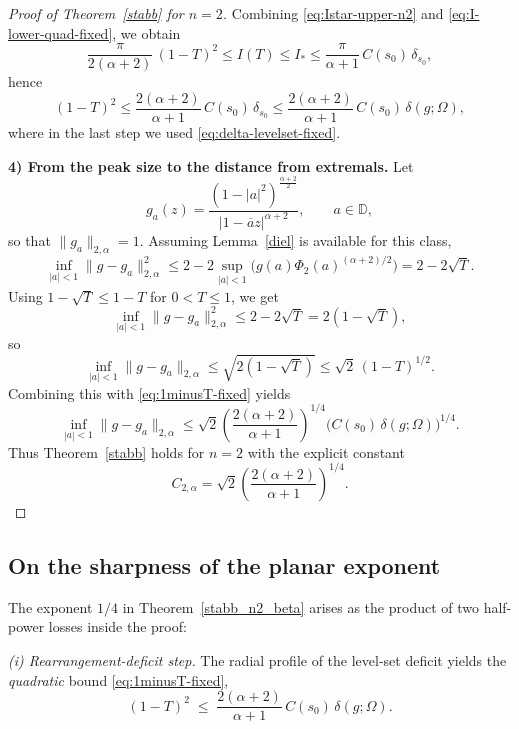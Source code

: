 \documentclass[a4paper,10pt]{amsart}
\newcommand{\D}{\mathbb{D}}
\begin{document}
\begin{proof}[Proof of Theorem~\ref{stabb} for $n=2$]
Combining \eqref{eq:Istar-upper-n2} and \eqref{eq:I-lower-quad-fixed}, we obtain
\[
\frac{\pi}{2(\alpha+2)}\,(1-T)^2
\le I(T)\le I_*
\le \frac{\pi}{\alpha+1}\,C(s_0)\,\delta_{s_0},
\]
hence
\begin{equation}\label{eq:1minusT-fixed}
(1-T)^2
\le
\frac{2(\alpha+2)}{\alpha+1}\,C(s_0)\,\delta_{s_0}
\le
\frac{2(\alpha+2)}{\alpha+1}\,C(s_0)\,\delta(g;\Omega),
\end{equation}
where in the last step we used \eqref{eq:delta-levelset-fixed}.

\smallskip\noindent
\textbf{4) From the peak size to the distance from extremals.}
Let
\[
g_a(z)=
\frac{(1-|a|^2)^{\frac{\alpha+2}{2}}}{|1-\overline{a}z|^{\alpha+2}},
\qquad a\in\D,
\]
so that $\|g_a\|_{2,\alpha}=1$. Assuming Lemma~\ref{diel} is available for this class,
\begin{equation}\label{eq:diel-n2-fixed}
\inf_{|a|<1}\|g-g_a\|_{2,\alpha}^2
\le
2-2\sup_{|a|<1}\bigl(g(a)\Phi_2(a)^{(\alpha+2)/2}\bigr)
=
2-2\sqrt{T}.
\end{equation}
Using $1-\sqrt{T}\le 1-T$ for $0<T\le1$, we get
\[
\inf_{|a|<1}\|g-g_a\|_{2,\alpha}^2
\le
2-2\sqrt{T}
=
2(1-\sqrt{T}),
\]
so
\[
\inf_{|a|<1}\|g-g_a\|_{2,\alpha}
\le
\sqrt{2(1-\sqrt{T})}
\le
\sqrt{2}\,(1-T)^{1/2}.
\]
Combining this with \eqref{eq:1minusT-fixed} yields
\[
\inf_{|a|<1}\|g-g_a\|_{2,\alpha}
\le
\sqrt{2}\left(\frac{2(\alpha+2)}{\alpha+1}\right)^{1/4}
\bigl(C(s_0)\,\delta(g;\Omega)\bigr)^{1/4}.
\]
Thus Theorem~\ref{stabb} holds for $n=2$ with the explicit constant
\[
C_{2,\alpha}
=
\sqrt{2}\left(\frac{2(\alpha+2)}{\alpha+1}\right)^{1/4}.
\]
\end{proof}

\subsection{On the sharpness of the planar exponent}\label{ssec:sharpness-n2}

The exponent $1/4$ in Theorem~\ref{stabb_n2_beta} arises as the product of two
half-power losses inside the proof:

\smallskip\noindent\emph{(i) Rearrangement-deficit step.} The radial profile of
the level-set deficit yields the \emph{quadratic} bound
\eqref{eq:1minusT-fixed},
\begin{equation}\label{eq:sharpness-step-i}
(1-T)^2\;\le\;\frac{2(\alpha+2)}{\alpha+1}\,C(s_0)\,\delta(g;\Omega).
\end{equation}
\end{document}
